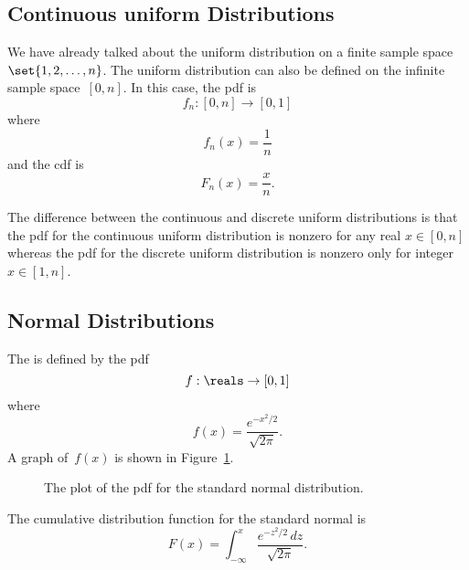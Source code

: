 \subsection{Continuous uniform Distributions}

We have already talked about the uniform distribution on a finite
sample space~$\set{1, 2, \dots, n}$.  The uniform distribution can
also be defined on the infinite sample space~$[0, n]$.  In this case,
the pdf is
\begin{equation*}
    f_n: [0, n] \to [0, 1]
\end{equation*}
where
\begin{equation*}
    f_n(x) = \frac{1}{n}
\end{equation*}
and the cdf is
\begin{equation*}
    F_n(x) = \frac{x}{n}.
\end{equation*}

The difference between the continuous and discrete uniform
distributions is that the pdf for the continuous uniform distribution
is nonzero for any real $x \in [0, n]$ whereas the pdf for the
discrete uniform distribution is nonzero only for integer~$x \in [1,
  n]$.

\subsection{Normal Distributions}

The  is defined by the pdf
\begin{equation*}
    f: \reals \to [0, 1]
\end{equation*}
where
\begin{equation*}
    f(x) = \frac{ e^{-x^2/2} }{ \sqrt{2\pi} }.
\end{equation*}
A graph of~$f(x)$ is shown in Figure~\ref{fig:16L1}.

\begin{figure}



\caption{The plot of the pdf for the standard normal distribution.}

\label{fig:16L1}

\end{figure}

The cumulative distribution function for the standard normal is
\begin{equation*}
    F(x) = \int_{-\infty}^x \frac{ e^{-z^2/2} \, dz }{\sqrt{2\pi}}.
\end{equation*}

